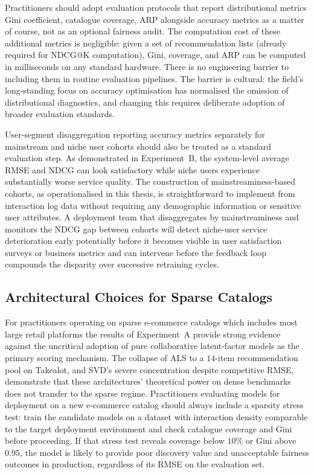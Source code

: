 \documentclass[11pt,a4paper]{report}
\begin{document}
Practitioners should adopt evaluation protocols that report distributional metrics Gini coefficient, catalogue coverage, ARP alongside accuracy metrics as a matter of course, not as an optional fairness audit. The computation cost of these additional metrics is negligible: given a set of recommendation lists (already required for NDCG@K computation), Gini, coverage, and ARP can be computed in milliseconds on any standard hardware. There is no engineering barrier to including them in routine evaluation pipelines. The barrier is cultural: the field's long-standing focus on accuracy optimisation has normalised the omission of distributional diagnostics, and changing this requires deliberate adoption of broader evaluation standards.

User-segment disaggregation reporting accuracy metrics separately for mainstream and niche user cohorts should also be treated as a standard evaluation step. As demonstrated in Experiment~B, the system-level average RMSE and NDCG can look satisfactory while niche users experience substantially worse service quality. The construction of mainstreaminess-based cohorts, as operationalised in this thesis, is straightforward to implement from interaction log data without requiring any demographic information or sensitive user attributes. A deployment team that disaggregates by mainstreaminess and monitors the NDCG gap between cohorts will detect niche-user service deterioration early potentially before it becomes visible in user satisfaction surveys or business metrics and can intervene before the feedback loop compounds the disparity over successive retraining cycles.

\subsection*{Architectural Choices for Sparse Catalogs}

For practitioners operating on sparse e-commerce catalogs which includes most large retail platforms the results of Experiment~A provide strong evidence against the uncritical adoption of pure collaborative latent-factor models as the primary scoring mechanism. The collapse of ALS to a $14$-item recommendation pool on Takealot, and SVD's severe concentration despite competitive RMSE, demonstrate that these architectures' theoretical power on dense benchmarks does not transfer to the sparse regime. Practitioners evaluating models for deployment on a new e-commerce catalog should always include a sparsity stress test: train the candidate models on a dataset with interaction density comparable to the target deployment environment and check catalogue coverage and Gini before proceeding. If that stress test reveals coverage below $10\%$ or Gini above $0.95$, the model is likely to provide poor discovery value and unacceptable fairness outcomes in production, regardless of its RMSE on the evaluation set.
\end{document}
